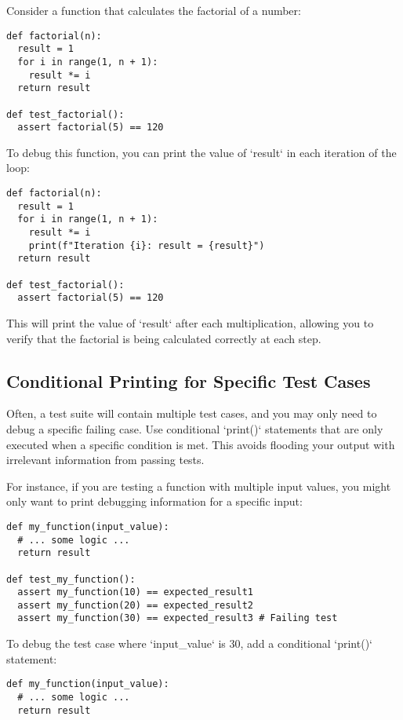 \documentclass{article}
\begin{document}
{{{{Consider a function that calculates the factorial of a number:

\begin{verbatim}
def factorial(n):
  result = 1
  for i in range(1, n + 1):
    result *= i
  return result

def test_factorial():
  assert factorial(5) == 120
\end{verbatim}

To debug this function, you can print the value of `result` in each iteration of the loop:

\begin{verbatim}
def factorial(n):
  result = 1
  for i in range(1, n + 1):
    result *= i
    print(f"Iteration {i}: result = {result}")
  return result

def test_factorial():
  assert factorial(5) == 120
\end{verbatim}

This will print the value of `result` after each multiplication, allowing you to verify that the factorial is being calculated correctly at each step.

\subsection*{Conditional Printing for Specific Test Cases}

Often, a test suite will contain multiple test cases, and you may only need to debug a specific failing case. Use conditional `print()` statements that are only executed when a specific condition is met. This avoids flooding your output with irrelevant information from passing tests.

For instance, if you are testing a function with multiple input values, you might only want to print debugging information for a specific input:

\begin{verbatim}
def my_function(input_value):
  # ... some logic ...
  return result

def test_my_function():
  assert my_function(10) == expected_result1
  assert my_function(20) == expected_result2
  assert my_function(30) == expected_result3 # Failing test
\end{verbatim}

To debug the test case where `input_value` is 30, add a conditional `print()` statement:

\begin{verbatim}
def my_function(input_value):
  # ... some logic ...
  return result


\end{verbatim}}}}}
\end{document}

